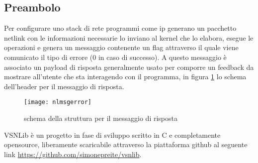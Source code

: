 \subsection{Preambolo}
Per configurare uno stack di rete programmi come ip generano un pacchetto netlink con le informazioni necessarie lo inviano al kernel che lo elabora, esegue le operazioni e genera un messaggio contenente un flag attraverso il quale viene comunicato il tipo di errore (0 in caso di successo). A questo messaggio \`e associato un payload di risposta generalmente usato per comporre un feedback da mostrare all'utente che sta interagendo con il programma, in figura \ref{fig:nlmserror} lo schema dell'header per il messaggio di risposta.\\
\begin{figure}[h]                       %
\begin{center}                          %
\texttt{[image: nlmsgerror]}%
%
\caption[struct nlmserror]{schema della struttura per il messaggio di risposta}\label{fig:nlmserror}
\end{center}
\end{figure}
VSNLib \`e un progetto in fase di sviluppo scritto in C e completamente opensource, liberamente scaricabile attraverso la piattaforma github al seguente link \url{https://github.com/simonepreite/vsnlib}.

